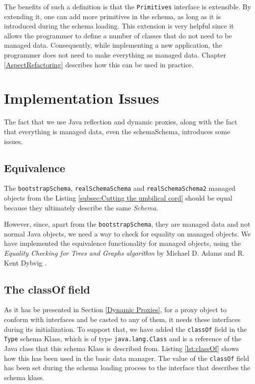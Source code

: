 The benefits of such a definition is that the \texttt{Primitives} interface is extensible.
By extending it, one can add more primitives in the schema, as long as it is introduced during the schema loading.
This extension is very helpful since it allows the programmer to define a number of classes that do not need to be managed data.
Consequently, while implementing a new application, the programmer does not need to make everything as managed data.
Chapter \ref{AspectRefactoring} describes how this can be used in practice.

\section{Implementation Issues}\label{Implementation Issues}
The fact that we use Java reflection and dynamic proxies, along with the fact that everything is managed data, even the schemaSchema, introduces some issues.

\subsection{Equivalence}\label{Managed Object equivalence}
The \texttt{bootstrapSchema}, \texttt{realSchemaSchema} and \texttt{realSchemaSchema2} managed objects from the Listing \ref{subsec:Cutting the umbilical cord} should be equal because they ultimately describe the same \textit{Schema}.

However, since, apart from the \texttt{bootstrapSchema}, they are managed data and not normal Java objects, we need a way to check for equality on managed objects.
We have implemented the equivalence functionality for managed objects, using the \textit{Equality Checking for Trees and Graphs algorithm} by Michael D. Adams and R. Kent Dybvig \cite{adams2008efficient}.

\subsection{The classOf field}\label{The classOf field}
As it has be presented in Section \ref{Dynamic Proxies}, for a proxy object to conform with interfaces and be casted to any of them, it needs these interfaces during its initialization.
To support that, we have added the \texttt{classOf} field in the \texttt{Type} schema Klass, which is of type \texttt{java.lang.Class} and is a reference of the Java class that this schema Klass is described from.
Listing \ref{lst:classOf} shows how this has been used in the basic data manager.
The value of the \texttt{classOf} field has been set during the schema loading process to the interface that describes the schema klass.

